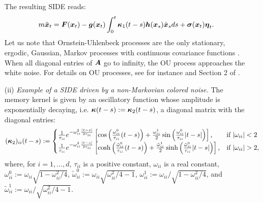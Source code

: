\begin{itemize}
 The resulting SIDE reads:
\begin{equation} \label{side2}
m \ddot{\boldsymbol{x}}_{t} =  \boldsymbol{F}(\boldsymbol{x}_{t})  - \boldsymbol{g}(\boldsymbol{x}_{t})\int_{0}^{t} \boldsymbol{\kappa}_{1}(t-s) \boldsymbol{h}(\boldsymbol{x}_{s}) \dot{\boldsymbol{x}}_{s} ds + \boldsymbol{\sigma}(\boldsymbol{x}_{t}) \boldsymbol{\eta}_{t}.
\end{equation}
Let us note that Ornstein-Uhlenbeck processes are the only stationary, ergodic, Gaussian, Markov processes with continuous covariance functions \cite{pavliotis2014stochastic}.  When all diagonal entries of $\boldsymbol{A}$ go to infinity, the OU process approaches the white noise.  For details on OU processes, see for instance  \cite{pavliotis2014stochastic} and Section 2 of \cite{hottovy2015small}.
\item[(ii)] {\it Example of a SIDE driven by a non-Markovian colored noise.} The memory kernel is given by an oscillatory function whose amplitude is exponentially decaying, i.e. $ \boldsymbol{\kappa}(t-s) := \boldsymbol{\kappa}_2(t-s)$, a diagonal matrix with the diagonal entries:
\begin{equation}\label{harmonic_memory}
(\vecc{\kappa}_{2})_{ii}(t-s) :=
\begin{cases}
    \frac{1}{\tau_{ii}} e^{-\omega_{ii}^2  \frac{|t-s|}{2 \tau_{ii}}}\left[\cos\left(\frac{\omega^0_{ii}}{\tau_{ii}} (t-s) \right) + \frac{\omega^1_{ii}}{2} \sin\left(\frac{\omega^0_{ii}}{\tau_{ii}} |t-s| \right) \right], & \text{if } |\omega_{ii}|<2 \\
  \frac{1}{\tau_{ii}} e^{-\omega_{ii}^2  \frac{|t-s|}{2 \tau_{ii}}}\left[\cosh\left(\frac{\tilde{\omega}^0_{ii}}{\tau_{ii}}(t-s) \right) + \frac{\tilde{\omega}^1_{ii}}{2} \sinh\left(\frac{\tilde{\omega}^0_{ii}}{\tau_{ii}} |t-s| \right) \right],  & \text{if } |\omega_{ii}|>2, 
\end{cases}
\end{equation}
where, for $i=1,\dots,d$, $\tau_{ii}$ is a positive constant, $\omega_{ii}$ is a real constant, $\omega^0_{ii} := \omega_{ii}\sqrt{1-\omega_{ii}^2/4}$, $\tilde{\omega}^0_{ii} := \omega_{ii}\sqrt{\omega_{ii}^2/4-1}$, $\omega_{ii}^1 := \omega_{ii}/\sqrt{1-\omega_{ii}^2/4}$, and $\tilde{\omega}_{ii}^1 := \omega_{ii}/\sqrt{\omega_{ii}^2/4-1}$.  


\end{itemize}
